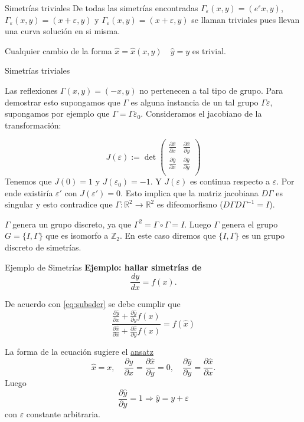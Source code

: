 \documentclass[handout,hyperref={colorlinks=true}]{beamer}
\newcommand{\rr}{\mathbb{R}}
\renewcommand{\emph}[1]{\textcolor[rgb]{1,0,0}{#1}}
\renewcommand{\epsilon}{\varepsilon}
\newcommand{\nl}{\onslide<+-> }
\begin{document}
\begin{frame}{Simetrías triviales}
\nl De todas las simetrías encontradas $\Gamma_{\epsilon}(x,y)=(e^{\epsilon}x,y)$, $\Gamma_{\epsilon}(x,y)=(x+\epsilon,y)$ y  $\Gamma_{\epsilon}(x,y)=(x+\epsilon,y)$ se llaman \emph{triviales} pues llevan una curva solución en si misma. 

\nl Cualquier cambio de la forma $\hat{x}=\hat{x}(x,y)\quad \hat{y}=y$ es trivial.

\nl \fbox{\begin{minipage}{\linewidth}\emph{Estamos interesados en hallar grupos de Lie uniparamétricos de simetrías no triviales.}
    \end{minipage}
  }
\end{frame}


\begin{frame}{Simetrías triviales}


\nl Las reflexiones $\Gamma(x,y)=(-x,y)$  no pertenecen a tal tipo de  grupo. Para demostrar esto supongamos que  $\Gamma$ es alguna instancia de un tal grupo $\Gamma{\epsilon}$, supongamos por ejemplo que $\Gamma=\Gamma{\epsilon_0}$.  Consideramos el jacobiano de la transformación:

\[J(\epsilon):=\det\begin{pmatrix} \frac{\partial\hat{x}}{\partial x}&  \frac{\partial\hat{x}}{\partial y}\\
 \frac{\partial\hat{y}}{\partial x} &  \frac{\partial\hat{y}}{\partial y}\\
\end{pmatrix}
\]
\nl Tenemos que $J(0)=1$ y $J(\epsilon_0)=-1$. Y $J(\epsilon)$ es continua respecto a $\epsilon$. Por ende existiría $\epsilon'$ con $J(\epsilon')=0$. Esto implica que la matriz jacobiana $D\Gamma$ es singular y esto contradice que $\Gamma:\rr^2\to \rr^2$ es difeomorfismo ($D\Gamma D\Gamma^{-1}=I$).



\nl $\Gamma$  genera un grupo discreto, ya que $\Gamma^2=\Gamma\circ \Gamma=I$. Luego $\Gamma$ genera el grupo $G=\{I,\Gamma\}$ que es isomorfo a $\mathbb{Z}_2$. En este caso diremos que    $\{I,\Gamma\}$ es un \emph{grupo discreto} de simetrías. 
\end{frame}



 \begin{frame}{Ejemplo de Simetrías}
 \textbf{Ejemplo: hallar simetrías de }
\[\frac{dy}{dx}=f(x).\]

De acuerdo con \eqref{eq:subsder} se debe cumplir que 
 \[\frac{\frac{\partial\hat{y}}{\partial x}+\frac{\partial\hat{y}}{\partial y}f(x)}{\frac{\partial\hat{x}}{\partial x}+\frac{\partial\hat{x}}{\partial y}f(x)}=f(\hat{x})\]

La forma de la ecuación sugiere el  \href{http://es.wikipedia.org/wiki/Ansatz}{ansatz}
   \[\boxed{\hat{x}=x},\quad \frac{\partial\hat{y}}{\partial x}=\frac{\partial\hat{x}}{\partial y}=0,\quad
   \frac{\partial\hat{y}}{\partial y}=\frac{\partial\hat{x}}{\partial x}. \]
 Luego 
\[\frac{\partial\hat{y}}{\partial y}=1\Rightarrow \boxed{\hat{y}=y+\epsilon} \]
con $\epsilon$ constante arbitraria.
 \end{frame}
\end{document}
